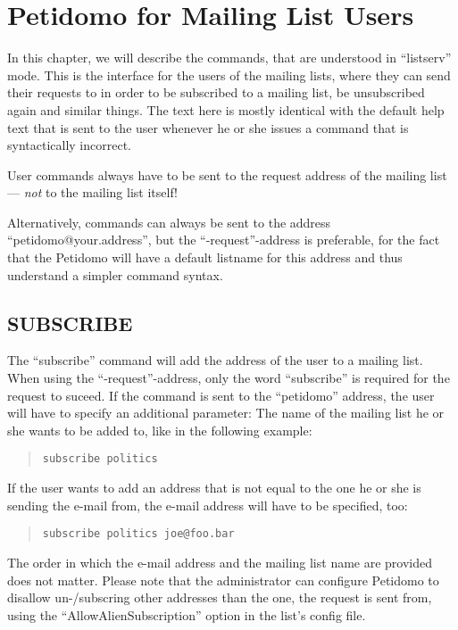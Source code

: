 \documentclass[a4paper,11pt]{scrreprt}
\begin{document}
\chapter{Petidomo for Mailing List Users}
\label{petidomo as user}

In this chapter, we will describe the commands, that are understood in
``listserv'' mode. This is the interface for the users of the mailing
lists, where they can send their requests to in order to be subscribed
to a mailing list, be unsubscribed again and similar things. The text
here is mostly identical with the default help text that is sent to
the user whenever he or she issues a command that is syntactically
incorrect.

User commands always have to be sent to the request address of
the mailing list --- \emph{not} to the mailing list itself!

Alternatively, commands can always be sent to the address
``peti\-do\-mo@your.ad\-dress'', but the ``-request''-address is
preferable, for the fact that the Petidomo will have a default
listname for this address and thus understand a simpler command
syntax.

\section{SUBSCRIBE}

The ``subscribe'' command will add the address of the user to a
mailing list. When using the ``-request''-address, only the word
``subscribe'' is required for the request to suceed. If the command is
sent to the ``petidomo'' address, the user will have to specify an
additional parameter: The name of the mailing list he or she wants to
be added to, like in the following example:
\begin{quote}
\begin{verbatim}
subscribe politics
\end{verbatim}
\end{quote}

If the user wants to add an address that is not equal to the one he or
she is sending the e-mail from, the e-mail address will have to be
specified, too:
\begin{quote}
\begin{verbatim}
subscribe politics joe@foo.bar
\end{verbatim}
\end{quote}

The order in which the e-mail address and the mailing list name are
provided does not matter. Please note that the administrator can
configure Petidomo to disallow un-/subscring other addresses than
the one, the request is sent from, using the
``AllowAlienSubscription'' option in the list's config file.
\end{document}
